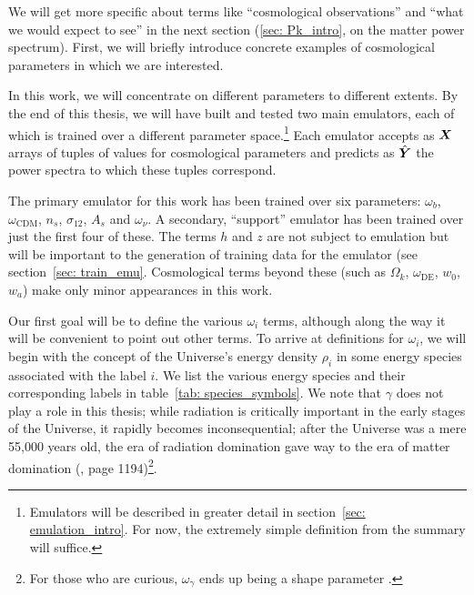 We will get more specific about terms like ``cosmological observations''
and ``what we would expect to see'' in the next section (\ref{sec: Pk_intro}, 
on the matter power spectrum). First, we will briefly introduce concrete
examples of cosmological parameters in which we are interested.

In this work, we will concentrate on different parameters to different 
extents. 
By the end of this thesis, we will have built and tested two main
emulators, each of which is trained over a different parameter
space.\footnote{Emulators will be described in greater detail in
section~\ref{sec: emulation_intro}. For now, the extremely simple definition 
from the summary will suffice.}
Each emulator accepts as $\bm{X}$ arrays of tuples of values for 
cosmological 
parameters and predicts as $\hat{\bm{Y}}$ the power spectra to which these
tuples correspond. 

The primary emulator for this work has been trained over six parameters:
$\omega_b$, $\omega_\text{CDM}$, $n_s$, $\sigma_{12}$, $A_s$ and $\omega_\nu$.
A secondary, ``support'' emulator has been trained over just the first four of
these. The terms $h$ and $z$ are not subject to emulation but will be 
important to the generation of training data for the emulator (see 
section~\ref{sec: train_emu}. Cosmological terms beyond these (such as
$\Omega_k$, $\omega_\text{DE}$, $w_0$, $w_a$) make only minor appearances in 
this work.


Our first goal will be to define the various $\omega_i$ terms, although along
the way it will be convenient to point out other terms. To arrive at
definitions for $\omega_i$, we will begin with the concept of the Universe's 
energy density $\rho_i$
in some energy species associated with the label $i$. We list the various
energy species and their corresponding labels in
table~\ref{tab: species_symbols}.
We note that $\gamma$ does not play a role in this thesis;
while radiation is critically important in the early stages of the
Universe, it rapidly becomes inconsequential; after the Universe was a mere
55,000 years old, the
era of radiation domination gave way to the era of matter domination 
(, page 1194)\footnote{For those who are
curious, $\omega_\gamma$ ends up being a shape parameter .}.

